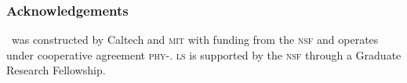 \documentclass{beamer}
\begin{document}
\begin{frame}
	\frametitle{Acknowledgements}
\LIGO\ was constructed by Caltech and \textsc{mit} with funding from the
\textsc{nsf} and operates under cooperative agreement
\textsc{phy}-. \textsc{ls} is supported by the
\textsc{nsf} through a Graduate Research Fellowship.
\newline\newline

\begin{center}
\end{center}
\end{frame}
\end{document}
